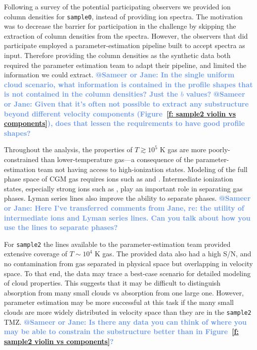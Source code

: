 \documentclass[fleqn,usenatbib]{mnras}
\makeatletter
\newcommand{\atsameer}[1]{\textcolor{CornflowerBlue}{\textbf{@Sameer or Jane: #1}}}
\makeatother
\begin{document}
Following a survey of the potential participating observers we provided ion column densities for \texttt{sample0}, instead of providing ion spectra.
The motivation was to decrease the barrier for participation in the challenge by skipping the extraction of column densities from the spectra.
However, the observers that did participate employed a parameter-estimation pipeline built to accept spectra as input.
Therefore providing the column densities as the synthetic data both required the parameter estimation team to adapt their pipeline, and limited the information we could extract.
\atsameer{In the single uniform cloud scenario, what information is contained in the profile shapes that is not contained in the column densities? Just the $b$ values?}
\atsameer{Given that it's often not possible to extract any substructure beyond different velocity components (Figure~\ref{f: sample2 violin vs components}), does that lessen the requirements to have good profile shapes?}

Throughout the analysis, the properties of $T \gtrsim 10^5$ K gas are more poorly-constrained than lower-temperature gas---a consequence of the parameter-estimation team not having access to high-ionization states.
Modeling of the full phase space of CGM gas requires ions such as  and .
Intermediate ionization states,  especially strong ions such as , play an important role in separating gas phases.
Lyman series lines also improve the ability to separate phases.
\atsameer{Here I've transferred comments from Jane, re: the utility of intermediate ions and Lyman series lines. Can you talk about how you use the lines to separate phases?}

For \texttt{sample2} the lines available to the parameter-estimation team provided extensive coverage of $T \sim 10^4$ K gas.
The provided data also had a high S/N, and no contamination from gas separated in physical space but overlapping in velocity space.
To that end, the data may trace a best-case scenario for detailed modeling of cloud properties.
This suggests that it may be difficult to distinguish absorption from many small clouds vs absorption from one large one.
However, parameter estimation may be more successful at this task if the many small clouds are more widely distributed in velocity space than they are in the \texttt{sample2} TMZ.
\atsameer{Is there any data you can think of where you may be able to constrain the substructure better than in Figure~\ref{f: sample2 violin vs components}?}
\end{document}

